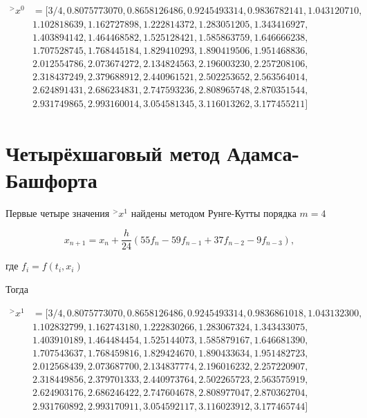 \documentclass[14pt,a4paper]{scrartcl}
\begin{document}
\begin{align*}
	^>x^0 &= [3/4, 0.8075773070, 0.8658126486, 0.9245493314, 0.9836782141,
	1.043120710, \\& 1.102818639, 1.162727898, 1.222814372, 1.283051205,
	1.343416927, \\& 1.403894142, 1.464468582, 1.525128421, 1.585863759,
	1.646666238, \\& 1.707528745, 1.768445184, 1.829410293, 1.890419506,
	1.951468836, \\& 2.012554786, 2.073674272, 2.134824563, 2.196003230,
	2.257208106, \\& 2.318437249, 2.379688912, 2.440961521, 2.502253652,
	2.563564014, \\& 2.624891431, 2.686234831, 2.747593236, 2.808965748,
	2.870351544, \\& 2.931749865, 2.993160014, 3.054581345, 3.116013262,
	3.177455211]
\end{align*}





\section*{Четырёхшаговый метод Адамса-Башфорта}
Первые четыре значения $^>x^1$ найдены методом Рунге-Кутты порядка $m=4$

\begin{equation*}
	x_{n+1}=x_{n}+\frac{h}{24}\left(55 f_{n}-59 f_{n-1}+37 f_{n-2}-9 f_{n-3}\right),
\end{equation*}

где $f_i = f(t_i,x_i)$


Тогда


\begin{align*}
	^>x^1 &= [3/4, 0.8075773070, 0.8658126486, 0.9245493314, 0.9836861018,
	1.043132300, \\& 1.102832799, 1.162743180, 1.222830266, 1.283067324,
	1.343433075, \\& 1.403910189, 1.464484454, 1.525144073, 1.585879167,
	1.646681390, \\& 1.707543637, 1.768459816, 1.829424670, 1.890433634,
	1.951482723, \\& 2.012568439, 2.073687700, 2.134837774, 2.196016232,
	2.257220907, \\& 2.318449856, 2.379701333, 2.440973764, 2.502265723,
	2.563575919, \\& 2.624903176, 2.686246422, 2.747604678, 2.808977047,
	2.870362704, \\& 2.931760892, 2.993170911, 3.054592117, 3.116023912,
	3.177465744]
\end{align*}
\end{document}

